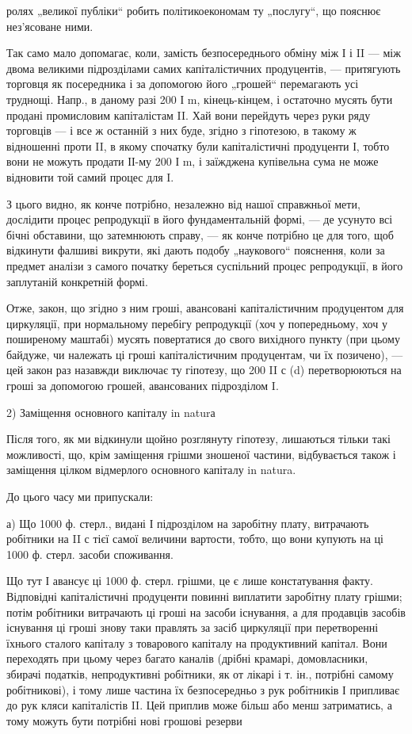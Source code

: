 ролях „великої публіки“ робить політикоекономам ту „послугу“, що
пояснює нез’ясоване ними.

Так само мало допомагає, коли, замість безпосереднього обміну між
І і II — між двома великими підрозділами самих капіталістичних продуцентів,
— притягують торговця як посередника і за допомогою його „грошей“
перемагають усі труднощі. Напр., в даному разі 200 І m, кінець-кінцем,
і остаточно мусять бути продані промисловим капіталістам II. Хай вони
перейдуть через руки ряду торговців — і все ж останній з них буде, згідно
з гіпотезою, в такому ж відношенні проти II, в якому спочатку були
капіталістичні продуценти І, тобто вони не можуть продати ІІ-му 200 І m,
і заїжджена купівельна сума не може відновити той самий процес для I.

З цього видно, як конче потрібно, незалежно від нашої справжньої
мети, дослідити процес репродукції в його фундаментальній формі, —
де усунуто всі бічні обставини, що затемнюють справу, — як конче
потрібно це для того, щоб відкинути фалшиві викрути, які дають подобу
„наукового“ пояснення, коли за предмет аналізи з самого початку
береться суспільний процес репродукції, в його заплутаній конкретній
формі.

Отже, закон, що згідно з ним гроші, авансовані капіталістичним продуцентом
для циркуляції, при нормальному перебігу репродукції (хоч у
попередньому, хоч у поширеному маштабі) мусять повертатися до свого
вихідного пункту (при цьому байдуже, чи належать ці гроші капіталістичним
продуцентам, чи їх позичено), — цей закон раз назавжди виключає
ту гіпотезу, що 200 II с (d) перетворюються на гроші за допомогою
грошей, авансованих підрозділом I.

2) Заміщення основного капіталу in naturа

Після того, як ми відкинули щойно розглянуту гіпотезу, лишаються
тільки такі можливості, що, крім заміщення грішми зношеної частини, відбувається
також і заміщення цілком відмерлого основного капіталу in natura.

До цього часу ми припускали:

а) Що 1000 ф. стерл., видані І підрозділом на заробітну плату, витрачають
робітники на II с тієї самої величини вартости, тобто, що вони
купують на ці 1000 ф. стерл. засоби споживання.

Що тут І авансує ці 1000 ф. стерл. грішми, це є лише констатування
факту. Відповідні капіталістичні продуценти повинні виплатити заробітну
плату грішми; потім робітники витрачають ці гроші на засоби
існування, а для продавців засобів існування ці гроші знову таки правлять
за засіб циркуляції при перетворенні їхнього сталого капіталу
з товарового капіталу на продуктивний капітал. Вони переходять при
цьому через багато каналів (дрібні крамарі, домовласники, збирачі
податків, непродуктивні робітники, як от лікарі і т. ін., потрібні самому
робітникові), і тому лише частина їх безпосередньо з рук робітників І
припливає до рук кляси капіталістів II. Цей приплив може більш або
менш затриматись, а тому можуть бути потрібні нові грошові резерви
